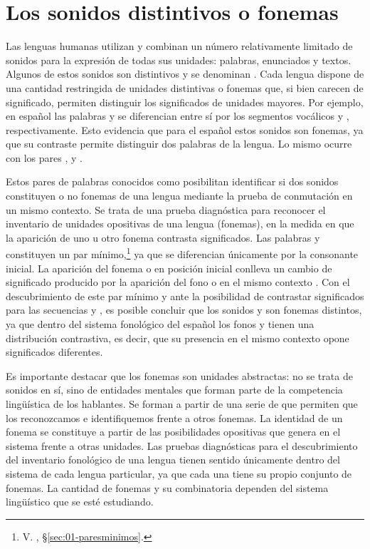 \section{Los sonidos distintivos o fonemas}

Las lenguas humanas utilizan y combinan un número relativamente limitado de
sonidos para la expresión de todas sus unidades: palabras, enunciados y textos.
Algunos de estos sonidos son distintivos y se denominan . Cada
lengua dispone de una cantidad restringida de unidades distintivas o fonemas
que, si bien carecen de significado, permiten distinguir los significados de
unidades mayores. Por ejemplo, en español las palabras  y 
se diferencian entre sí por los segmentos vocálicos  y ,
respectivamente. Esto evidencia que para el español estos sonidos son fonemas,
ya que su contraste permite distinguir dos palabras de la lengua. Lo mismo
ocurre con los pares ,  y .

Estos pares de palabras conocidos como  posibilitan
identificar si dos sonidos constituyen o no fonemas de una lengua mediante la
prueba de conmutación en un mismo contexto. Se trata de una prueba diagnóstica
para reconocer el inventario de unidades opositivas de una lengua (fonemas), en
la medida en que la aparición de uno u otro fonema contrasta significados. Las
palabras  y  constituyen un par mínimo,\footnote{V.
, §\ref{sec:01-paresminimos}.} ya que se diferencian únicamente por la
consonante inicial. La aparición del fonema  o  en posición
inicial conlleva un cambio de significado producido por la aparición del fono
 o  en el mismo contexto . Con el descubrimiento de este
par mínimo y ante la posibilidad de contrastar significados para las secuencias
 y , es posible concluir que los sonidos  y 
son fonemas distintos, ya que dentro del sistema fonológico del español los
fonos  y  tienen una distribución contrastiva, es decir, que su
presencia en el mismo contexto opone significados diferentes.

Es importante destacar que los fonemas son unidades abstractas: no se trata de
sonidos en sí, sino de entidades mentales que forman parte de la competencia
lingüística de los hablantes. Se forman a partir de una serie de
 que permiten que los reconozcamos e identifiquemos
frente a otros fonemas. La identidad de un fonema se constituye a partir de las
posibilidades opositivas que genera en el sistema frente a otras unidades. Las
pruebas diagnósticas para el descubrimiento del inventario fonológico de una
lengua tienen sentido únicamente dentro del sistema de cada lengua particular, ya
que cada una tiene su propio conjunto de fonemas. La cantidad de fonemas y su
combinatoria dependen del sistema lingüístico que se esté estudiando.

